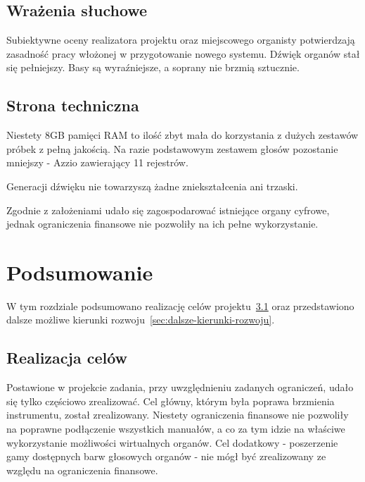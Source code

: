 \documentclass[11pt]{report}
\begin{document}
    \section{Wrażenia słuchowe}\label{sec:wrażenia-słuchowe}
    Subiektywne oceny realizatora projektu oraz miejscowego organisty potwierdzają zasadność pracy włożonej w przygotowanie nowego systemu.
    Dźwięk organów stał się pełniejszy.
    Basy są wyraźniejsze, a soprany nie brzmią sztucznie.


    \section{Strona techniczna}\label{sec:strona-techniczna}
    Niestety 8GB pamięci RAM to ilość zbyt mała do korzystania z dużych zestawów próbek z pełną jakością.
    Na razie podstawowym zestawem głosów pozostanie mniejszy - Azzio zawierający 11 rejestrów.

    Generacji dźwięku nie towarzyszą żadne zniekształcenia ani trzaski.

    Zgodnie z założeniami udało się zagospodarować istniejące organy cyfrowe,
    jednak ograniczenia finansowe nie pozwoliły na ich pełne wykorzystanie.


    \chapter{Podsumowanie}
    W tym rozdziale podsumowano realizację celów projektu~\ref{sec:realizacja-celów} oraz przedstawiono dalsze możliwe kierunki rozwoju~\ref{sec:dalsze-kierunki-rozwoju}.


    \section{Realizacja celów}\label{sec:realizacja-celów}
    Postawione w projekcie zadania, przy uwzględnieniu zadanych ograniczeń, udało się tylko częściowo zrealizować.
    Cel główny, którym była poprawa brzmienia instrumentu, został zrealizowany.
    Niestety ograniczenia finansowe nie pozwoliły na poprawne podłączenie wszystkich manuałów,
    a co za tym idzie na właściwe wykorzystanie możliwości wirtualnych organów.
    Cel dodatkowy - poszerzenie gamy dostępnych barw głosowych organów - nie mógł być zrealizowany ze względu na ograniczenia finansowe.
\end{document}
